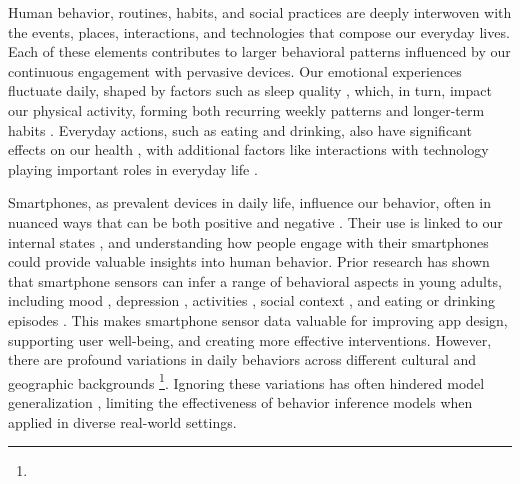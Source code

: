 Human behavior, routines, habits, and social practices are deeply interwoven with the events, places, interactions, and technologies that compose our everyday lives. Each of these elements contributes to larger behavioral patterns influenced by our continuous engagement with pervasive devices. Our emotional experiences fluctuate daily, shaped by factors such as sleep quality \cite{khalid2024sleepnet}, which, in turn, impact our physical activity, forming both recurring weekly patterns \cite{tseng2016assessing} and longer-term habits \cite{harari202019}. Everyday actions, such as eating and drinking, also have significant effects on our health \cite{biel2018bites, santani2018drinksense}, with additional factors like interactions with technology playing important roles in everyday life  \cite{das2019multisensor}.


Smartphones, as prevalent devices in daily life, influence our behavior, often in nuanced ways that can be both positive \cite{lin2021revisiting} and negative \cite{2017-SOCINFO}. Their use is linked to our internal states \cite{elhai2018depression, buda2021outliers}, and understanding how people engage with their smartphones could provide valuable insights into human behavior. Prior research has shown that smartphone sensors can infer a range of behavioral aspects in young adults, including mood \cite{servia2017mobile, meegahapola2023generalization}, depression \cite{xu2023globem}, activities \cite{haresamudram2021contrastive, assi2023complex}, social context \cite{mader2024learning, hernandez2024proximity}, and eating or drinking episodes \cite{bae2017detecting, santani2018drinksense, thomaz2016automatic, biel2018bites}. This makes smartphone sensor data valuable for improving app design, supporting user well-being, and creating more effective interventions. However, there are profound variations in daily behaviors across different cultural and geographic backgrounds \cite{foner2020introduction}\footnote{}. Ignoring these variations has often hindered model generalization \cite{meegahapola2023generalization, khwaja2019modeling}, limiting the effectiveness of behavior inference models when applied in diverse real-world settings.


